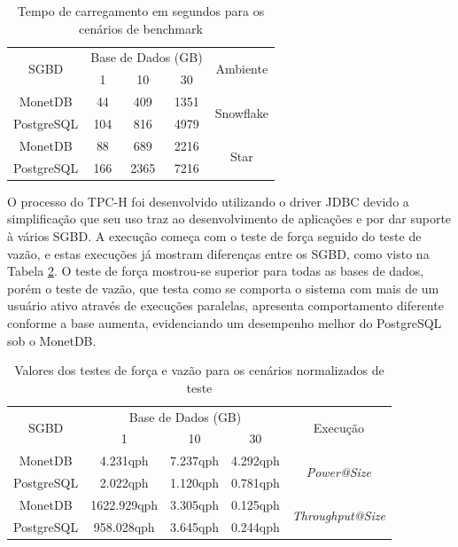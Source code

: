 \documentclass[12pt]{article}
\begin{document}
\begin{table}[htpb]
    \centering
    \caption{Tempo de carregamento em segundos para os cenários de benchmark}
    \label{tab:carregamento}
    \begin{tabular}{c|ccc|c}
    \hline
    \multirow{2}{*}{SGBD} & \multicolumn{3}{c|}{Base de Dados (GB)} & \multirow{2}{*}{Ambiente}  \\
                          & 1           & 10          & 30          &                            \\ \hline
    MonetDB               & 44          & 409         & 1351        & \multirow{2}{*}{Snowflake} \\
    PostgreSQL            & 104         & 816         & 4979        &                            \\ \hline
    MonetDB               & 88          & 689         & 2216        & \multirow{2}{*}{Star}      \\
    PostgreSQL            & 166         & 2365        & 7216        &                            \\ \hline
    \end{tabular}
\end{table}

O processo do TPC-H foi desenvolvido utilizando o driver JDBC devido a simplificação 
que seu uso traz ao desenvolvimento de aplicações e por dar suporte à vários SGBD. A 
execução começa com o teste de força seguido do teste de vazão, e estas execuções já 
mostram diferenças entre os SGBD, como visto na Tabela \ref{tab:power-vazao-normalizado}. O teste de força 
mostrou-se superior para todas as bases de dados, porém o teste de vazão, que testa 
como se comporta o sistema com mais de um usuário ativo através de execuções paralelas, 
apresenta comportamento diferente conforme a base aumenta, evidenciando um desempenho 
melhor do PostgreSQL sob o MonetDB.

\begin{table}[htpb]
    \centering
    \caption{Valores dos testes de força e vazão para os cenários normalizados de teste}
    \label{tab:power-vazao-normalizado}
    \begin{tabular}{c|ccc|c}
    \hline
    \multirow{2}{*}{SGBD} & \multicolumn{3}{c|}{Base de Dados (GB)} & \multirow{2}{*}{Execução}       \\
                          & 1             & 10         & 30         &                                 \\ \hline
    MonetDB               & 4.231qph         & 7.237qph      & 4.292qph      & \multirow{2}{*}{\textit{Power@Size}} \\
    PostgreSQL            & 2.022qph         & 1.120qph      & 0.781qph      &                                 \\ \hline
    MonetDB               & 1622.929qph      & 3.305qph      & 0.125qph      & \multirow{2}{*}{\textit{Throughput@Size}} \\
    PostgreSQL            & 958.028qph       & 3.645qph      & 0.244qph      &                                 \\ \hline
    \end{tabular}
\end{table}
\end{document}
